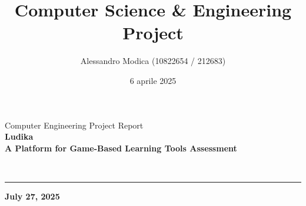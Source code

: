 \documentclass[11pt,italian,a4paper]{article}
\title{Computer Science & Engineering Project}
\author{Alessandro Modica (10822654 / 212683)}
\date{6 aprile 2025}
\begin{document}
\begin{titlepage}
    \begin{center}

        \Huge{Computer Engineering Project Report}\\
        \vspace*{0.5cm}
        \Huge\textbf{Ludika}\\
        \LARGE\textbf{A Platform for Game-Based Learning Tools Assessment}\\

        \vspace*{2cm}

         \\
        \rule[0.5ex]{\textwidth}{0.5pt}


        \vspace*{2cm}

        \begin{minipage}{0.6\textwidth}
            \begin{flushleft}
                \Large{}
            \end{flushleft}
        \end{minipage}
        \begin{minipage}{0.35\textwidth}
            \begin{flushright}
                \Large\noindent\textbf{July 27, 2025}
            \end{flushright}
        \end{minipage}

    \end{center}

    \vfill


\end{titlepage}
\end{document}
